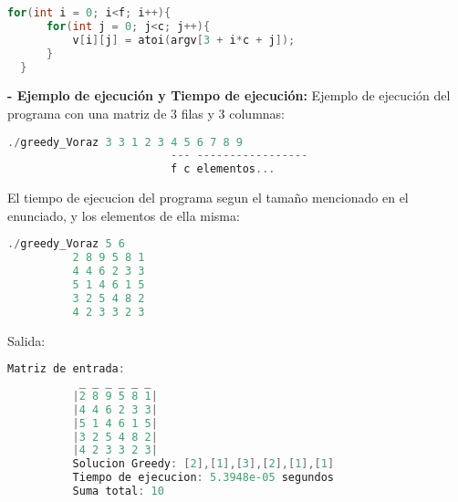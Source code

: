 \documentclass[12pt, letterpaper]{article}
\begin{document}
\begin{itemize}
\begin{lstlisting}[language=C++, basicstyle=\ttfamily\footnotesize]
  for(int i = 0; i<f; i++){
      for(int j = 0; j<c; j++){
          v[i][j] = atoi(argv[3 + i*c + j]);
      }
  } 
          \end{lstlisting}
          \subitem\textbf{- Ejemplo de ejecución y Tiempo de ejecución:}\newline
          Ejemplo de ejecución del programa con una matriz de 3 filas y 3 columnas:
          \begin{lstlisting}[language=C++, basicstyle=\ttfamily\footnotesize]
          ./greedy_Voraz 3 3 1 2 3 4 5 6 7 8 9
                         --- -----------------
                         f c elementos...
          \end{lstlisting}
  \newpage %
          El tiempo de ejecucion del programa segun el tamaño mencionado en el enunciado, y los elementos de ella misma:
          \begin{lstlisting}[language=C++, basicstyle=\ttfamily\footnotesize]
          ./greedy_Voraz 5 6 
          2 8 9 5 8 1 
          4 4 6 2 3 3 
          5 1 4 6 1 5 
          3 2 5 4 8 2 
          4 2 3 3 2 3
          \end{lstlisting}
      Salida:
          \begin{lstlisting}[language=C++, basicstyle=\ttfamily\footnotesize]
          Matriz de entrada:
           _ _ _ _ _ _
          |2 8 9 5 8 1|
          |4 4 6 2 3 3|
          |5 1 4 6 1 5|
          |3 2 5 4 8 2|
          |4 2 3 3 2 3|
          Solucion Greedy: [2],[1],[3],[2],[1],[1]
          Tiempo de ejecucion: 5.3948e-05 segundos
          Suma total: 10
          \end{lstlisting}

        

      \end{itemize}
\end{document}

